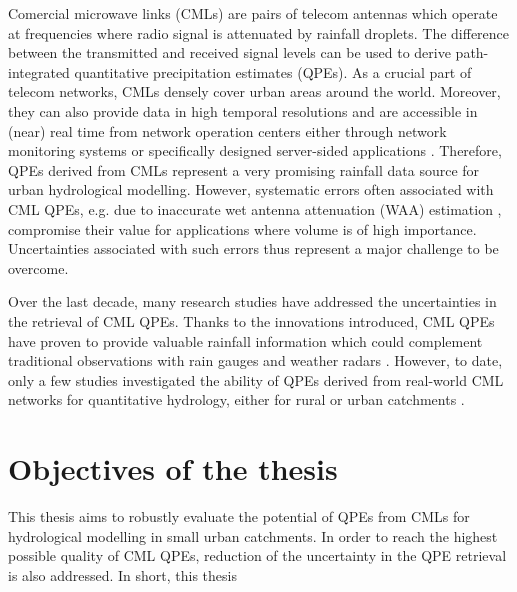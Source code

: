 \documentclass{ctuthesis}\usepackage[]{graphicx}\usepackage[]{color}
\begin{document}
Comercial microwave links (CMLs) are pairs of telecom antennas which operate at frequencies where radio signal is attenuated by rainfall droplets. The difference between the transmitted and received signal levels can be used to derive path-integrated quantitative precipitation estimates (QPEs). As a crucial part of telecom networks, CMLs densely cover urban areas around the world. Moreover, they can also provide data in high temporal resolutions and are accessible in (near) real time from network operation centers either through network monitoring systems or specifically designed server-sided applications \citep{chwalaRealtimeDataAcquisition2016}. Therefore, QPEs derived from CMLs represent a very promising rainfall data source for urban hydrological modelling. However, systematic errors often associated with CML QPEs, e.g. due to inaccurate wet antenna attenuation (WAA) estimation \citep{leijnseMicrowaveLinkRainfall2008, fenclGaugeadjustedRainfallEstimates2017}, compromise their value for applications where volume is of high importance. Uncertainties associated with such errors thus represent a major challenge to be overcome.

Over the last decade, many research studies have addressed the uncertainties in the retrieval of CML QPEs. Thanks to the innovations introduced, CML QPEs have proven to provide valuable rainfall information which could complement traditional observations with rain gauges and weather radars \citep{chwalaCommercialMicrowaveLink2019, gossetImprovingRainfallMeasurement2016, imhoffRainfallNowcastingUsing2020, riosgaonaRainfallRetrievalCommercial2018, uijlenhoetOpportunisticRemoteSensing2018}. However, to date, only a few studies investigated the ability of QPEs derived from real-world CML networks for quantitative hydrology, either for rural \citep{brauerEffectDifferencesRainfall2016, cazzanigaCalculatingHydrologicalResponse2020, smiatekPotentialCommercialMicrowave2017} or urban catchments \citep{dischImpactDifferentSources2019, stranskyRunoffPredictionUsing2018}.


\section{Objectives of the thesis}

This thesis aims to robustly evaluate the potential of QPEs from CMLs for hydrological modelling in small urban catchments. In order to reach the highest possible quality of CML QPEs, reduction of the uncertainty in the QPE retrieval is also addressed. In short, this thesis
\end{document}
